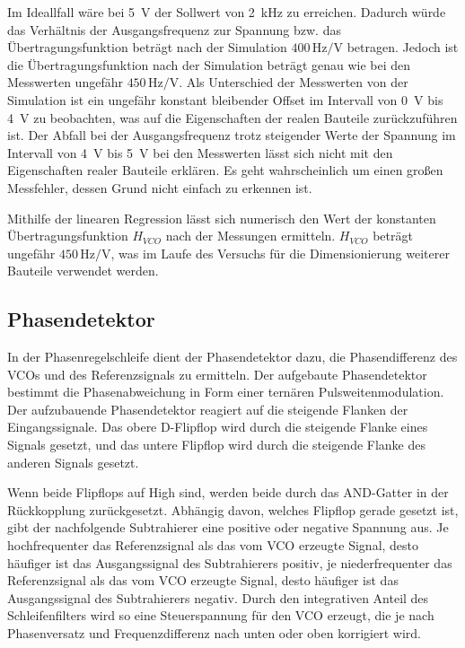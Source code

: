 Im Ideallfall wäre bei \SI{5}{\volt} der Sollwert von \SI{2}{\kilo\hertz} zu erreichen. Dadurch würde das Verhältnis der Ausgangsfrequenz zur Spannung bzw. das Übertragungsfunktion beträgt nach der Simulation  $400\, \si{\hertz\per\volt}$ betragen. Jedoch ist die Übertragungsfunktion nach der Simulation beträgt genau wie bei den Messwerten ungefähr $450\, \si{\hertz\per\volt}$. Als Unterschied der Messwerten von der Simulation ist ein ungefähr konstant bleibender Offset im Intervall von \SI{0}{\volt} bis \SI{4}{\volt} zu beobachten, was auf die Eigenschaften der realen Bauteile zurückzuführen ist. Der Abfall bei der Ausgangsfrequenz trotz steigender Werte der Spannung im Intervall von \SI{4}{\volt} bis \SI{5}{\volt} bei den Messwerten lässt sich nicht mit den Eigenschaften realer Bauteile erklären. Es geht wahrscheinlich um einen großen Messfehler, dessen Grund nicht einfach zu erkennen ist. 

Mithilfe der linearen Regression lässt sich numerisch den Wert der konstanten Übertragungsfunktion $H_{VCO}$ nach der Messungen ermitteln. $H_{VCO}$ beträgt ungefähr $450\, \si{\hertz\per\volt}$, was im Laufe des Versuchs für die Dimensionierung weiterer Bauteile verwendet werden.





\subsection{Phasendetektor}

In der Phasenregelschleife dient der Phasendetektor dazu, die Phasendifferenz des VCOs und des Referenzsignals zu ermitteln. Der aufgebaute Phasendetektor bestimmt die Phasenabweichung in Form einer ternären Pulsweitenmodulation. Der aufzubauende Phasendetektor reagiert auf die steigende Flanken der Eingangssignale. Das obere D-Flipflop wird durch die steigende Flanke eines Signals gesetzt, und das untere Flipflop wird durch die steigende Flanke des anderen Signals gesetzt.

 Wenn beide Flipflops auf High sind, werden beide durch das AND-Gatter in der Rückkopplung zurückgesetzt. Abhängig davon, welches Flipflop gerade gesetzt ist, gibt der nachfolgende Subtrahierer eine positive oder negative Spannung aus.
Je hochfrequenter das Referenzsignal als das vom VCO erzeugte Signal, desto häufiger ist das Ausgangssignal des Subtrahierers positiv, je niederfrequenter das Referenzsignal als das vom VCO erzeugte Signal, desto häufiger ist das Ausgangssignal des Subtrahierers negativ. Durch den integrativen Anteil des Schleifenfilters wird so eine
Steuerspannung für den VCO erzeugt, die je nach Phasenversatz und Frequenzdifferenz nach unten oder oben korrigiert wird. \cite{Skript}

